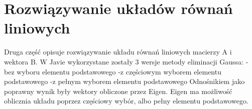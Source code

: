 \documentclass[10pt]{article}
\begin{document}
\begin{center}
\end{center}



\section{Rozwiązywanie układów równań liniowych}
Druga część opisuje rozwiązywanie układu równań liniowych macierzy A i wektora B.
W Javie wykorzystane zostały 3 wersje metody eliminacji Gaussa:
-bez wyboru elementu podstawowego
-z częściowym wyborem elementu podstawowego
-z pełnym wyborem elementu podstawowego
Odnośnikiem jako poprawny wynik były wektory obliczone przez Eigen. Eigen ma możliwość oblicznia układu poprzez częściowy wybór, albo pełny elementu podstawowego.
\end{document}
